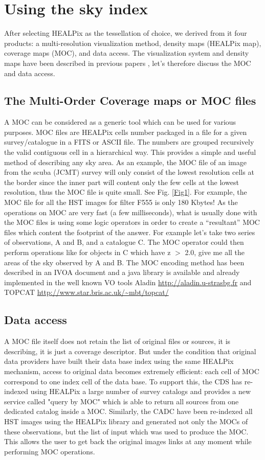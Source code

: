 \documentclass[11pt,twoside]{article}
\begin{document}
\section{Using the sky index}
After selecting HEALPix as the tessellation of choice, we derived from it four products: a multi-resolution visualization method, density maps (HEALPix map), coverage maps (MOC), and data access. The visualization system and density maps have been described in previous papers \cite{Fernique}, let's therefore discuss the MOC and data access.

\subsection{The Multi-Order Coverage maps or MOC files}
A MOC can be considered as a generic tool which can be used for various purposes. MOC files are HEALPix cells number packaged in a file for a given survey/catalogue in a FITS or ASCII file. The numbers are grouped recursively the valid contiguous cell in a hierarchical way. This provides a simple and useful method of describing any sky area. 
As an example, the MOC file of an image from the scuba (JCMT) survey
will only consist of the lowest resolution cells at the
border since the inner part will content only the few cells
at the lowest resolution, thus the MOC file is quite small.
See Fig. \ref{Fig1}.
For example, the MOC file for all the HST images for filter F555 is only 180 Kbytes! As the operations on MOC are very fast (a few milliseconds), what is usually done with the MOC files is using some logic
operators in order to create a ``resultant'' MOC files which
content the footprint of the answer. For example let's take
two series of observations, A and B, and a catalogue
C. The MOC operator could then perform operations like for objects in C which have z $>$ 2.0, give me all the areas of the sky observed by A and B.
The MOC encoding method has been described in an IVOA document and a java library is available and already implemented in the well known VO tools Aladin  \url{http://aladin.u-strasbg.fr} and TOPCAT  \url{http://www.star.bris.ac.uk/~mbt/topcat/}

\subsection{Data access}
A MOC file itself does not retain the list of original files or sources, it is describing, it is just a coverage descriptor. But under the condition that original data providers have built their data base index using the same HEALPix mechanism, access to original data becomes extremely efficient: each cell of MOC correspond to one index cell of the data base. 
To support this, the CDS has re-indexed using HEALPix a large number of survey catalogs and provides a new service called "query by MOC" which is able to return all sources from one dedicated catalog inside a MOC. Similarly, the CADC have been re-indexed all HST images using the HEALPix library and generated not only the MOCs of these observations, but the list of input which was used to produce the MOC. This allows the user to get back the original images links at any moment while performing MOC operations.
\end{document}
